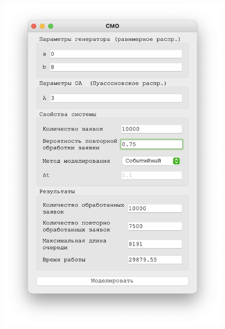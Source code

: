  
 \begin{figure}[!htb]
    \begin{minipage}{0.55\textwidth}
      \centering
      \includegraphics[width=1\linewidth]{3-75-s}
    \end{minipage}\hfill
    \begin{minipage}{0.55\textwidth}
      \centering

\end{minipage}
\end{figure}
